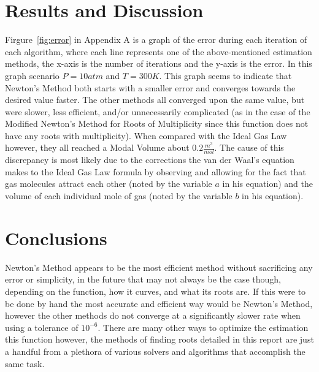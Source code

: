 \documentclass[12pt, letterpaper]{article}
\begin{document}
\section{Results and Discussion}
    	Firgure~\ref{fig:error} in Appendix A is a graph of the error during each iteration of each algorithm, where each line represents one of the above-mentioned estimation methods, the x-axis is the number of iterations and the y-axis is the error. In this graph scenario $P=10atm$ and $T=300K$. This graph seems to indicate that Newton's Method both starts with a smaller error and converges towards the desired value faster. The other methods all converged upon the same value, but were slower, less efficient, and/or unnecessarily complicated (as in the case of the Modified Newton's Method for Roots of Multiplicity since this function does not have any roots with multiplicity). When compared with the Ideal Gas Law however, they all reached a Modal Volume about $0.2\frac{m^3}{mol}$. The cause of this discrepancy is most likely due to the corrections the van der Waal's equation makes to the Ideal Gas Law formula by observing and allowing for the fact that gas molecules attract each other (noted by the variable $a$ in his equation) and the volume of each individual mole of gas (noted by the variable $b$ in his equation).
	
\section{Conclusions}
	Newton's Method appears to be the most efficient method without sacrificing any error or simplicity, in the future that may not always be the case though, depending on the function, how it curves, and what its roots are. If this were to be done by hand the most accurate and efficient way would be Newton's Method, however the other methods do not converge at a significantly slower rate when using a tolerance of $10^{-6}$. There are many other ways to optimize the estimation this function however, the methods of finding roots detailed in this report are just a handful from a plethora of various solvers and algorithms that accomplish the same task. 

\pagebreak
	
\appendix
\end{document}

